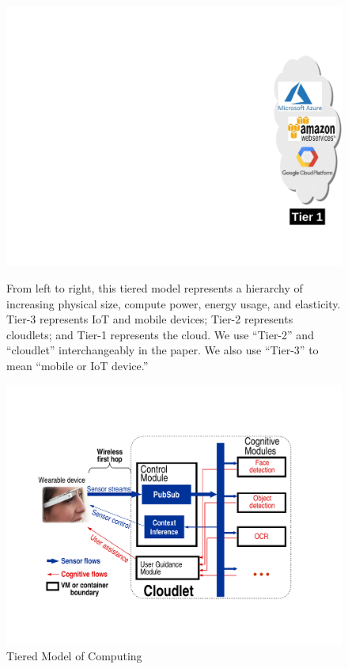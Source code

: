 \begin{figure}
\begin{minipage}[b]{4.3in}
\begin{minipage}[c]{0.55in}
\includegraphics[scale=0.33]{FIGS/fig-3tier-C.pdf}
\end{minipage}
\begin{captiontext}
  From left to right, this tiered model represents a hierarchy of
  increasing physical size, compute power, energy usage, and
  elasticity. Tier-3 represents IoT and mobile devices; Tier-2
  represents cloudlets; and Tier-1 represents the cloud.  We use
  ``Tier-2'' and ``cloudlet'' interchangeably in the paper.  We also
  use ``Tier-3'' to mean ``mobile or IoT device.''
\end{captiontext}
\vspace{-0.1in}
\caption{\small Tiered Model of Computing}
\label{fig:3tier}
\end{minipage}
\hspace*{0.1in}
\begin{minipage}[b]{2.5in}
\centering
\includegraphics[width=\linewidth]{FIGS/fig-backend-structure-simple-crop.pdf}

\end{minipage}
\end{figure}
